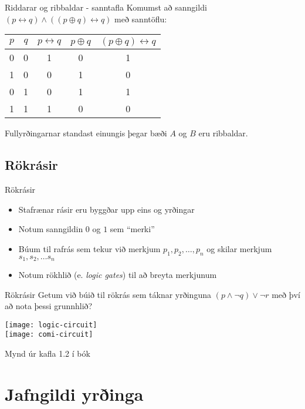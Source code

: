 \documentclass[handout]{beamer}
\begin{document}
\begin{frame}{Riddarar og ribbaldar - sanntafla}
Komumst að sanngildi $(p \leftrightarrow q) \land ((p \oplus q) \leftrightarrow q)$ með sanntöflu:
\begin{center}
\begin{tabular}{ccccc}
\toprule
$p$&$q$&$p \leftrightarrow q$&$p \oplus q$& $(p \oplus q) \leftrightarrow q$\\
\midrule
0&0&1&0&1\\
1&0&0&1&0\\
0&1&0&1&1\\
1&1&1&0&0\\
\bottomrule
\end{tabular}
\end{center}\pause
Fullyrðingarnar standast einungis þegar bæði $A$ og $B$ eru ribbaldar.
\end{frame}

\subsection{Rökrásir}

\begin{frame}{Rökrásir}
\begin{itemize}
 \item Stafrænar rásir eru byggðar upp eins og yrðingar
 \item Notum sanngildin $0$ og $1$ sem ``merki''
 \item Búum til rafrás sem tekur við merkjum $p_1, p_2, \ldots, p_n$ og skilar merkjum $s_1, s_2, \ldots s_n$
 
 \item Notum rökhlið (e. \emph{logic gates}) til að breyta merkjunum
\end{itemize}
\end{frame}

\begin{frame}{Rökrásir}
Getum við búið til rökrás sem táknar yrðinguna $(p \land \lnot q) \lor \lnot r$ með því að nota þessi grunnhlið?
\begin{center}
\texttt{[image: logic-circuit]}\\
\pause
\texttt{[image: comi-circuit]}
\end{center}
Mynd úr kafla 1.2 í bók
\end{frame}

\section{Jafngildi yrðinga}
\end{document}
